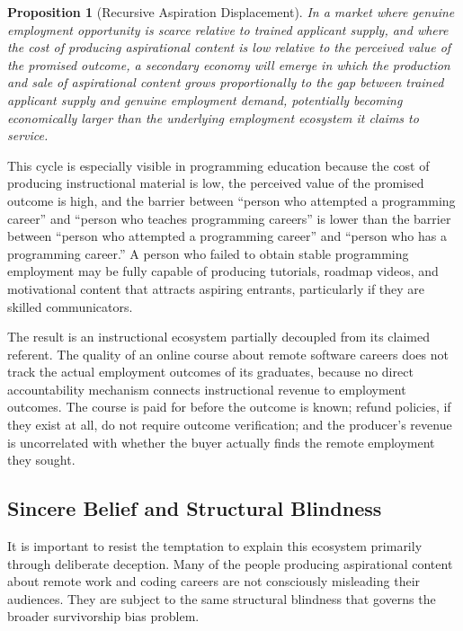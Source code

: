 \documentclass[12pt, a4paper]{article}
\theoremstyle{plain}
\newtheorem{proposition}{Proposition}[section]
\theoremstyle{definition}
\theoremstyle{remark}
\begin{document}
\begin{proposition}[Recursive Aspiration Displacement]
In a market where genuine employment opportunity is scarce relative to
trained applicant supply, and where the cost of producing aspirational content
is low relative to the perceived value of the promised outcome,
a secondary economy will emerge in which the production and sale of
aspirational content grows proportionally to the gap between
trained applicant supply and genuine employment demand,
potentially becoming economically larger than the underlying employment ecosystem
it claims to service.
\end{proposition}

This cycle is especially visible in programming education
because the cost of producing instructional material is low,
the perceived value of the promised outcome is high,
and the barrier between ``person who attempted a programming career''
and ``person who teaches programming careers'' is lower than
the barrier between ``person who attempted a programming career''
and ``person who has a programming career.''
A person who failed to obtain stable programming employment
may be fully capable of producing tutorials, roadmap videos,
and motivational content that attracts aspiring entrants,
particularly if they are skilled communicators.

The result is an instructional ecosystem partially decoupled from its claimed referent.
The quality of an online course about remote software careers
does not track the actual employment outcomes of its graduates,
because no direct accountability mechanism connects instructional revenue
to employment outcomes.
The course is paid for before the outcome is known;
refund policies, if they exist at all, do not require outcome verification;
and the producer's revenue is uncorrelated with whether the buyer
actually finds the remote employment they sought.

\subsection{Sincere Belief and Structural Blindness}

It is important to resist the temptation to explain this ecosystem
primarily through deliberate deception.
Many of the people producing aspirational content about remote work and coding careers
are not consciously misleading their audiences.
They are subject to the same structural blindness that governs
the broader survivorship bias problem.
\end{document}
